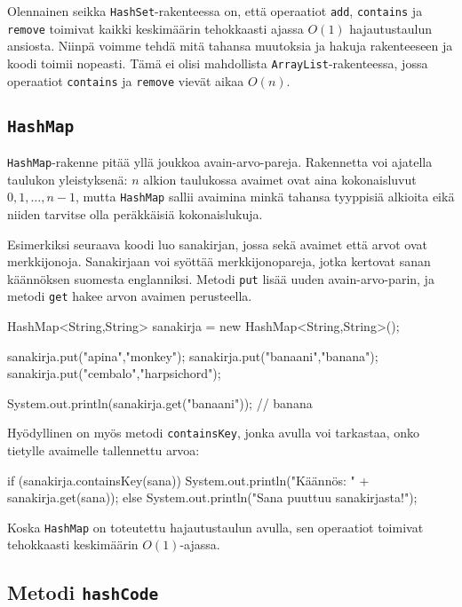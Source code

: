 Olennainen seikka \texttt{HashSet}-rakenteessa on,
että operaatiot \texttt{add}, \texttt{contains} ja \texttt{remove}
toimivat kaikki keskimäärin tehokkaasti ajassa $O(1)$
hajautustaulun ansiosta.
Niinpä voimme tehdä mitä tahansa muutoksia ja hakuja
rakenteeseen ja koodi toimii nopeasti.
Tämä ei olisi mahdollista \texttt{ArrayList}-rakenteessa,
jossa operaatiot \texttt{contains} ja \texttt{remove}
vievät aikaa $O(n)$.

\subsection{\texttt{HashMap}}

\texttt{HashMap}-rakenne pitää yllä joukkoa avain-arvo-pareja.
Rakennetta voi ajatella taulukon yleistyksenä:
$n$ alkion taulukossa avaimet ovat aina kokonaisluvut
$0,1,\ldots,n-1$, mutta \texttt{HashMap} sallii
avaimina minkä tahansa tyyppisiä alkioita eikä niiden
tarvitse olla peräkkäisiä kokonaislukuja.

Esimerkiksi seuraava koodi luo sanakirjan, jossa sekä
avaimet että arvot ovat merkkijonoja.
Sanakirjaan voi syöttää merkkijonopareja, jotka kertovat
sanan käännöksen suomesta englanniksi.
Metodi \texttt{put} lisää uuden avain-arvo-parin,
ja metodi \texttt{get} hakee arvon avaimen perusteella.

\begin{code}
HashMap<String,String> sanakirja = new HashMap<String,String>();

sanakirja.put("apina","monkey");
sanakirja.put("banaani","banana");
sanakirja.put("cembalo","harpsichord");

System.out.println(sanakirja.get("banaani")); // banana
\end{code}

Hyödyllinen on myös metodi \texttt{containsKey},
jonka avulla voi tarkastaa, onko tietylle avaimelle
tallennettu arvoa:

\begin{code}
if (sanakirja.containsKey(sana)) {
    System.out.println("Käännös: " + sanakirja.get(sana));
} else {
    System.out.println("Sana puuttuu sanakirjasta!");
}
\end{code}

Koska \texttt{HashMap} on toteutettu hajautustaulun avulla,
sen operaatiot toimivat tehokkaasti keskimäärin $O(1)$-ajassa.

\subsection{Metodi \texttt{hashCode}}

